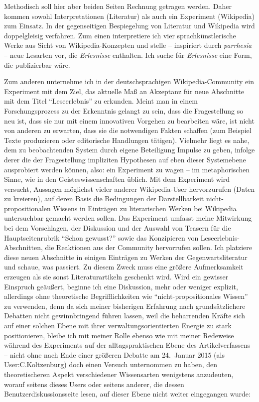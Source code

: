 \documentclass[fontsize=12pt]{scrartcl}
\begin{document}
Methodisch soll \mbox{hier} aber beiden Seiten Rechnung getragen werden. Daher kommen sowohl Interpretationen (Li\-te\-ra\-tur) als auch ein Experiment (Wi\-ki\-pe\-dia) zum Einsatz. In der gegenseitigen Bespiegelung von Li\-te\-ra\-tur und Wi\-ki\-pe\-dia wird doppelgleisig verfahren. Zum einen interpretiere ich \mbox{vier} sprachk\"unstlerische Werke aus Sicht von Wi\-ki\-pe\-dia-Konzepten und stelle -- inspiriert durch \textit{parrhesia} -- neue Lesarten vor, die \textit{Erlesnisse} enthalten. Ich suche f\"ur \textit{Erlesnisse} eine Form, die pu\-bli\-zierbar w\"are. 

Zum anderen unternehme ich in der deutschspra\-chi\-gen Wi\-ki\-pe\-dia-Community ein Experiment mit dem Ziel, das aktuelle Ma{\ss} an Akzeptanz f\"ur neue Abschnitte mit dem Titel "`Leseerlebnis"' zu erkunden. Meint man in einem For\-schungsprozess zu der Erkenntnis gelangt zu sein, dass die Fragestellung so neu ist, dass sie nur mit einem innovativen Vorgehen zu bearbeiten w\"are, ist nicht von anderen zu erwarten, dass sie die notwendigen Fakten schaffen (zum Beispiel Texte produzieren oder editorische Handlungen t\"atigen). Vielmehr liegt es nahe, dem zu beobachtenden System durch eigene Beteiligung Impulse zu geben, infolge derer die der Fragestellung impliziten Hypothesen auf eben dieser Systemebene ausprobiert werden k\"onnen, also: ein Experiment zu wagen -- im metaphorischen Sinne, wie in den Geisteswissenschaften \"ublich. Mit dem Experiment wird versucht, Aussagen m\"oglichst vieler an\-de\-rer Wi\-ki\-pe\-dia-User hervorzurufen (Daten zu kreieren), auf deren Basis die Bedingungen der Darstellbarkeit nicht-pro\-po\-si\-ti\-o\-na\-len Wissens in Eintr\"agen zu li\-te\-ra\-rischen Werken bei Wi\-ki\-pe\-dia untersuchbar gemacht werden sollen. Das Experiment umfasst meine Mitwirkung bei dem Vorschlagen, der Dis\-kus\-si\-on und der Auswahl von Teasern f\"ur die Hauptseitenrubrik "`Schon gewusst?"' sowie das Konzipieren von Leseerlebnis-Abschnitten, die Reaktionen aus der Community hervorrufen sollen. Ich platziere diese neuen Abschnitte in einigen Eintr\"agen zu Werken der Gegenwartsli\-te\-ra\-tur und schaue, was passiert. Zu diesem Zweck muss eine gr\"o{\ss}ere Aufmerksamkeit erzeugen als sie sonst Li\-te\-ra\-tur\-artikeln geschenkt wird. Wird ein gewisser Einspruch ge\"au{\ss}ert, beginne ich eine Dis\-kus\-si\-on, mehr oder weniger explizit, al\-ler\-dings ohne theo\-retische Begrifflichkeiten wie "`nicht-pro\-po\-si\-ti\-o\-na\-les Wissen"' zu verwenden, denn da sich meiner bis\-herigen Erfah\-rung nach grunds\"atzlichere Debatten nicht gewinnbringend f\"uhren lassen, weil die beharrenden Kr\"afte sich auf einer solchen Ebene mit ihrer verwaltungsorientierten Energie zu stark positionieren, bleibe ich mit meiner Rolle ebenso wie mit meiner Redeweise w\"ahrend des Experiments auf der all\-tags\-prak\-ti\-schen Ebene des Artikelverfassens -- nicht ohne nach Ende einer gr\"o{\ss}eren Debatte am \mbox{24. Januar} 2015 (als \mbox{User}:C.Kolt\-zen\-burg) doch einen Versuch unternommen zu haben, den theo\-retischeren Aspekt verschiedener Wissensarten wenigstens anzudeuten, worauf seitens dieses Users oder seitens an\-de\-rer, die dessen\textsuperscript{\tiny *} Be\-nut\-zerdis\-kus\-si\-onsseite lesen, auf dieser Ebene nicht weiter eingegangen wurde: 
\end{document}
